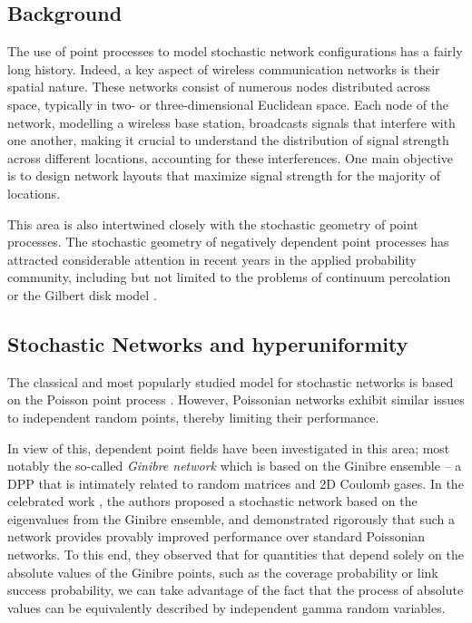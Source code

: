 \subsection{Background}
The use of point processes to model stochastic network configurations has a fairly long history. Indeed, a key aspect of wireless communication networks is their spatial nature. These networks consist of numerous nodes distributed across space, typically in two- or three-dimensional Euclidean space. Each node of the network, modelling a wireless base station, broadcasts signals that interfere with one another, making it crucial to understand the distribution of signal strength across different locations, accounting for these interferences. One main objective is to design network layouts that maximize signal strength for the majority of locations.


This area is also intertwined closely with the stochastic geometry of point processes. The stochastic geometry of negatively dependent point processes has attracted considerable attention in recent years in the applied probability community, including but not limited to the problems of continuum percolation or the Gilbert disk model \cite{yogesh, Baccelli-Blasz, Blaszczyszyn_Haenggi_Keeler_Mukherjee_2018, shirai-miyoshi, ghosh_aop}.

\subsection{Stochastic Networks and hyperuniformity}
The classical and most popularly studied model for stochastic networks is based on the Poisson point process \cite{Baccelli-Blasz,Blaszczyszyn_Haenggi_Keeler_Mukherjee_2018,Haenggi}. However, Poissonian networks exhibit similar issues to independent random points, thereby limiting their performance. 

In view of this, dependent point fields have been investigated in this area; most notably the so-called \textit{Ginibre network} which is based on the Ginibre ensemble -- a DPP that is intimately related to random matrices and 2D Coulomb gases. In the celebrated work \cite{shirai-miyoshi}, the authors proposed a stochastic network based on the eigenvalues from the Ginibre ensemble, and demonstrated rigorously that such a network provides provably improved performance over standard Poissonian networks. To this end, they observed that for quantities that depend solely on the absolute values of the Ginibre points, such as the coverage probability or link success probability, we can take advantage of the fact that the process of absolute values can be equivalently described by independent gamma random variables.

